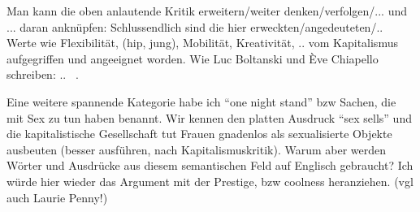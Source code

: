 
Man kann die oben anlautende Kritik erweitern/weiter denken/verfolgen/... und ... daran anknüpfen:
Schlussendlich sind die hier erweckten/angedeuteten/.. Werte wie Flexibilität, (hip, jung), Mobilität, Kreativität, .. vom Kapitalismus aufgegriffen und angeeignet worden.
Wie Luc Boltanski und Ève Chiapello schreiben: .. ~\cite[]{BolChi07}.

Eine weitere spannende Kategorie habe ich ``one night stand'' bzw Sachen, die mit Sex zu tun haben benannt.
Wir kennen den platten Ausdruck ``sex sells'' und die kapitalistische Gesellschaft tut Frauen gnadenlos als sexualisierte Objekte ausbeuten (besser ausführen, nach Kapitalismuskritik).
Warum aber werden Wörter und Ausdrücke aus diesem semantischen Feld auf Englisch gebraucht?
Ich würde hier wieder das Argument mit der Prestige, bzw coolness heranziehen. (vgl auch Laurie Penny!)



\begin{comment}
Eckert:

``Once the agent isolates and attributes significance to a feature, that feautre becomes a resource that he or she can incorporate or not into his or her own style.''
--> Switching is identified as a resource by the publishers of the magazine

1st order indexicality/Indizes
Latinas

2nd order
bewusste Nutzung von bilingualen Codes von den Herausgeberinnen um sich als Latinas zu positionieren und diese anzusprechen; eine Sisterhood zu simulieren

3rd order
social mobility/prestige?
\end{comment}



